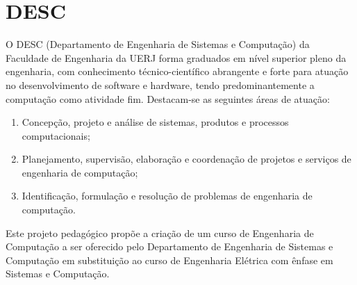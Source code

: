 \chapter{DESC}

O DESC (Departamento de Engenharia de Sistemas e Computação) da Faculdade de Engenharia da UERJ forma graduados em nível superior pleno da engenharia, com conhecimento técnico-científico abrangente e forte para atuação no desenvolvimento de software e hardware, tendo predominantemente a computação como atividade fim. Destacam-se as seguintes áreas de atuação:

\begin{enumerate}
	\item Concepção, projeto e análise de sistemas, produtos e processos computacionais;
	\item Planejamento, supervisão, elaboração e coordenação de projetos e serviços de engenharia de computação;
	\item Identificação, formulação e resolução de problemas de engenharia de computação.
\end{enumerate}

Este projeto pedagógico propõe a criação de um curso de Engenharia de Computação a ser oferecido pelo Departamento de Engenharia de Sistemas e Computação em substituição ao curso de Engenharia Elétrica com ênfase em Sistemas e Computação.
